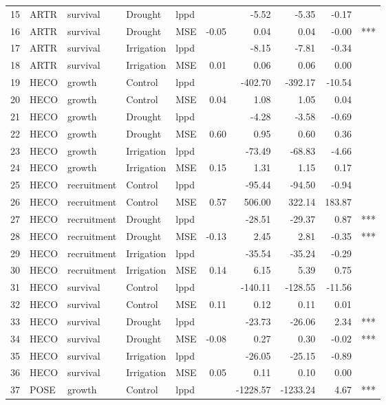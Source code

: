 \begin{longtable}{rllllrrrrl}
  15 & ARTR & survival & Drought & lppd &  & -5.52 & -5.35 & -0.17 &  \\ 
  16 & ARTR & survival & Drought & MSE & -0.05 & 0.04 & 0.04 & -0.00 & *** \\ 
  17 & ARTR & survival & Irrigation & lppd &  & -8.15 & -7.81 & -0.34 &  \\ 
  18 & ARTR & survival & Irrigation & MSE & 0.01 & 0.06 & 0.06 & 0.00 &  \\ 
  19 & HECO & growth & Control & lppd &  & -402.70 & -392.17 & -10.54 &  \\ 
  20 & HECO & growth & Control & MSE & 0.04 & 1.08 & 1.05 & 0.04 &  \\ 
  21 & HECO & growth & Drought & lppd &  & -4.28 & -3.58 & -0.69 &  \\ 
  22 & HECO & growth & Drought & MSE & 0.60 & 0.95 & 0.60 & 0.36 &  \\ 
  23 & HECO & growth & Irrigation & lppd &  & -73.49 & -68.83 & -4.66 &  \\ 
  24 & HECO & growth & Irrigation & MSE & 0.15 & 1.31 & 1.15 & 0.17 &  \\ 
  25 & HECO & recruitment & Control & lppd &  & -95.44 & -94.50 & -0.94 &  \\ 
  26 & HECO & recruitment & Control & MSE & 0.57 & 506.00 & 322.14 & 183.87 &  \\ 
  27 & HECO & recruitment & Drought & lppd &  & -28.51 & -29.37 & 0.87 & *** \\ 
  28 & HECO & recruitment & Drought & MSE & -0.13 & 2.45 & 2.81 & -0.35 & *** \\ 
  29 & HECO & recruitment & Irrigation & lppd &  & -35.54 & -35.24 & -0.29 &  \\ 
  30 & HECO & recruitment & Irrigation & MSE & 0.14 & 6.15 & 5.39 & 0.75 &  \\ 
  31 & HECO & survival & Control & lppd &  & -140.11 & -128.55 & -11.56 &  \\ 
  32 & HECO & survival & Control & MSE & 0.11 & 0.12 & 0.11 & 0.01 &  \\ 
  33 & HECO & survival & Drought & lppd &  & -23.73 & -26.06 & 2.34 & *** \\ 
  34 & HECO & survival & Drought & MSE & -0.08 & 0.27 & 0.30 & -0.02 & *** \\ 
  35 & HECO & survival & Irrigation & lppd &  & -26.05 & -25.15 & -0.89 &  \\ 
  36 & HECO & survival & Irrigation & MSE & 0.05 & 0.11 & 0.10 & 0.00 &  \\ 
  37 & POSE & growth & Control & lppd &  & -1228.57 & -1233.24 & 4.67 & *** \\ 

\end{longtable}
